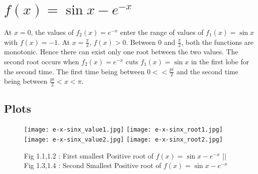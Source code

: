 \documentclass{article}
\begin{document}
\section{$f(x) = \sin{x} - e^{-x}$}
At $x = 0$, the values of $f_2(x) = e^{-x}$ enter the range of values of $f_1(x) = \sin{x}$ with $f(x) = -1$. At $x = \frac{\pi}{2}$, $f(x) > 0$. Between 0 and $\frac{\pi}{2}$, both the functions are monotonic. Hence there can exist only one root between the two values.
\newline
The second root occurs when $f_2(x) = e^{-x}$ cuts $f_1(x) = \sin{x}$ in the first lobe for the second time. The first time being between $0 < < \frac{pi}{2}$ and the second time being between $\frac{pi}{2} < x <\pi$.
\subsection{Plots}
\begin{figure}[!h]
    \centering
    \texttt{[image: e-x-sinx\_value1.jpg]}
    \texttt{[image: e-x-sinx\_root1.jpg]}
    \texttt{[image: e-x-sinx\_value2.jpg]}
    \texttt{[image: e-x-sinx\_root2.jpg]}
    \caption{Fig 1.1,1.2 : First smallest Positive root of $f(x) = \sin{x} - e^{-x}$ 
     || Fig 1.3,1.4 : Second Smallest Positive root of $f(x) = \sin{x} - e^{-x}$}
    \label{fig:ques6}
\end{figure}
\newpage
\end{document}
